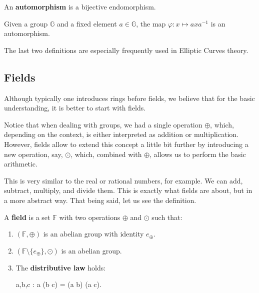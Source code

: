 \documentclass[../../book.tex]{subfiles}
\begin{document}
\begin{definition}
    An \textbf{automorphism} is a bijective endomorphism.
\end{definition}

\begin{example}
    Given a group $\mathbb{G}$ and a fixed element $a \in \mathbb{G}$, the map $\varphi: x \mapsto axa^{-1}$ is an automorphism.
\end{example}

The last two definitions are especially frequently used in Elliptic Curves theory.

\subsection{Fields}

Although typically one introduces rings before fields, we believe that for the 
basic understanding, it is better to start with fields. 

Notice that when dealing with groups, we had a single operation $\oplus$, which, depending on the context, is either 
interpreted as addition or multiplication. However, fields allow to extend this concept a little bit further by 
introducing a new operation, say, $\odot$, which, combined with $\oplus$, allows us to perform the basic arithmetic.

This is very similar to the real or rational numbers, for example. We can add, subtract, multiply, and divide them. 
This is exactly what fields are about, but in a more abstract way. That being said, let us see the definition.

\begin{definition}
    A \textbf{field} is a set $\mathbb{F}$ with two operations $\oplus$ and $\odot$ such that:
    \begin{enumerate}
        \item $(\mathbb{F}, \oplus)$ is an abelian group with identity $e_{\oplus}$.
        \item $(\mathbb{F} \setminus \{e_{\oplus}\}, \odot)$ is an abelian group.
        \item The \textbf{distributive law} holds: 
        \begin{xequation}
            \forall a,b,c \in {}: a \odot (b \oplus c) = (a \odot b) \oplus (a \odot c).            
        \end{xequation}
    \end{enumerate}
\end{definition}
\end{document}
